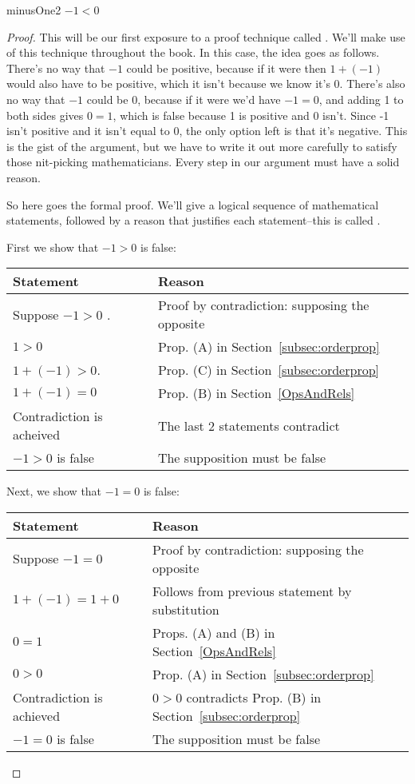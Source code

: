 \begin{prop}{minusOne2}
$-1 < 0$
\end{prop}

\begin{proof}
This will be our first exposure to a proof technique called . We'll make use of this technique throughout the book. In this case, the idea goes as follows.  There's no way that $-1$ could be positive, because if it were then $1 + (-1)$ would also have to be positive, which it isn't because we know it's 0.  There's also no way that $-1$ could be 0, because if it were we'd have $-1=0$, and adding 1 to both sides gives $0 = 1$, which is false because 1 is positive and 0 isn't.  Since -1 isn't positive and it isn't equal to 0, the only option left is that it's negative. This is the gist of the argument, but we have to write it out more carefully to satisfy those nit-picking mathematicians. Every step in our argument must have a solid reason. 

So here goes the formal proof. We'll give a logical sequence of mathematical statements, followed by a reason that justifies each statement--this is called .

\noindent
First we show that $-1 > 0$ is false:

\begin{tabular}{l| l}
Statement& Reason\\
\hline
Suppose $-1>0$ . & Proof by contradiction: supposing the opposite\\
$1>0$ &  Prop. (A) in Section~\ref{subsec:orderprop}\\
$1 + (-1)> 0$. & Prop. (C) in  Section~\ref{subsec:orderprop}\\
$1 + (-1) = 0$ & Prop. (B) in Section~\ref{OpsAndRels}\\
Contradiction is acheived&  The last 2 statements contradict\\
$-1>0 $ is false& The supposition must be false
\end{tabular}

\noindent
Next, we show that $-1=0$ is false:

\begin{tabular}{l| l}
Statement& Reason\\
\hline
Suppose $-1=0$ & Proof by contradiction: supposing the opposite\\
$1 + (-1) = 1 + 0$ & Follows from previous statement by substitution\\
$0=1$   & Props. (A) and (B) in Section~\ref{OpsAndRels}\\
$0>0$  & Prop. (A)  in  Section~\ref{subsec:orderprop}\\
Contradiction is achieved & $0>0$ contradicts Prop. (B)  in  Section~\ref{subsec:orderprop}\\
$-1 = 0$ is false &The supposition must be false
\end{tabular}


\end{proof}
